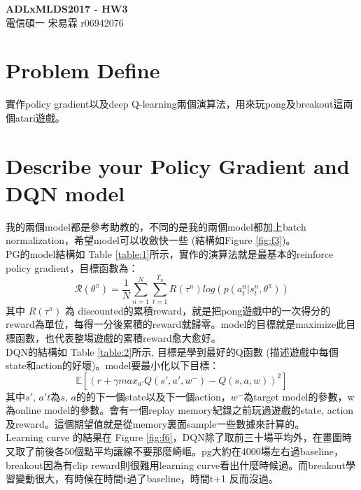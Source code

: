 \documentclass[12pt, a4paper]{article}
\begin{document}
\begin{CJK}{UTF8}{bkai}
\centering
\huge \textbf{ADLxMLDS2017 - HW3}\\
\raggedleft
\large {電信碩一 宋易霖 r06942076}\linebreak[2]\par
\end{CJK}

\begin{CJK}{UTF8}{bkai}
\section{Problem Define}
實作policy gradient以及deep Q-learning兩個演算法，用來玩pong及breakout這兩個atari遊戲。

\section{Describe your Policy Gradient and DQN model}
我的兩個model都是參考助教的，不同的是我的兩個model都加上batch normalization，希望model可以收斂快一些 (結構如Figure \ref{fig:f3})。\\
PG的model結構如 Table \ref{table:1}所示，實作的演算法就是最基本的reinforce policy gradient，目標函數為：
\[\mathcal{R}(\theta^{\pi}) = \frac{1}{N}\sum_{n=1}^{N}\sum_{t=1}^{T_n}R(\tau^n)log(p(a_t^n|s_t^n, \theta^{\pi})) \]
其中 $R(\tau^{\pi})$ 為 discounted的累積reward，就是把pong遊戲中的一次得分的reward為單位，每得一分後累積的reward就歸零。model的目標就是maximize此目標函數，也代表整場遊戲的累積reward愈大愈好。 \\
DQN的結構如 Table \ref{table:2}所示, 目標是學到最好的Q函數 (描述遊戲中每個state和action的好壞)。model要最小化以下目標：
\[ \mathbb{E}[(r + \gamma max_{a'}Q(s', a', w^{-}) - Q(s, a, w))^2] \]
其中$s'$, $a't$為$s$, $a$的的下一個state以及下一個action，$w^-$為target model的參數，w為online model的參數。會有一個replay memory紀錄之前玩過遊戲的state, action及reward。這個期望值就是從memory裏面sample一些數據來計算的。\\
Learning curve 的結果在 Figure \ref{fig:f6}，DQN除了取前三十場平均外，在畫圖時又取了前後各50個點平均讓線不要那麼崎嶇。pg大約在4000場左右過baseline，breakout因為有clip reward則很難用learning curve看出什麼時候過。而breakout學習變動很大，有時候在時間t過了baseline，時間t+1 反而沒過。


\end{CJK}
\end{document}
